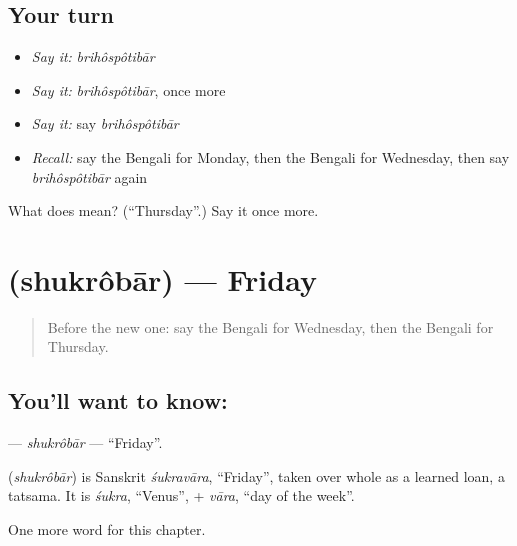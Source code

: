 \subsection*{Your turn}
\begin{itemize}
\raggedright
  \item \emph{Say it:} \emph{brihôspôtibār}
  \item \emph{Say it:} \emph{brihôspôtibār}, once more
  \item \emph{Say it:} say \emph{brihôspôtibār}
  \item \emph{Recall:} say the Bengali for Monday, then the Bengali for Wednesday, then say \emph{brihôspôtibār} again
\end{itemize}

\begin{tcolorbox}[breakable,colback=teal!4,colframe=teal!35!black,title={Before you move on}]
What does  mean? (\textquotedblleft{}Thursday\textquotedblright{}.) Say it once more.
\end{tcolorbox}
\section[\texorpdfstring{\bn{শুক্রবার} (shukrôbār)}{শুক্রবার (shukrôbār)}]{ (shukrôbār) — Friday}

\label{lesson:BN-C91-shukrobar}



\begin{quote}
Before the new one: say the Bengali for Wednesday, then the Bengali for Thursday.
\end{quote}

\subsection*{You'll want to know: }
\textbf{} — \emph{shukrôbār} — \textquotedblleft{}Friday\textquotedblright{}.

\begin{cousinweb}
\textbf{} (\emph{shukrôbār}) is Sanskrit \emph{śukravāra}, \textquotedblleft{}Friday\textquotedblright{}, taken over whole as a learned loan, a tatsama. It is \emph{śukra}, \textquotedblleft{}Venus\textquotedblright{}, + \emph{vāra}, \textquotedblleft{}day of the week\textquotedblright{}.
\end{cousinweb}

\begin{grammarlens}[title={What you've built}]
One more word for this chapter.
\end{grammarlens}

